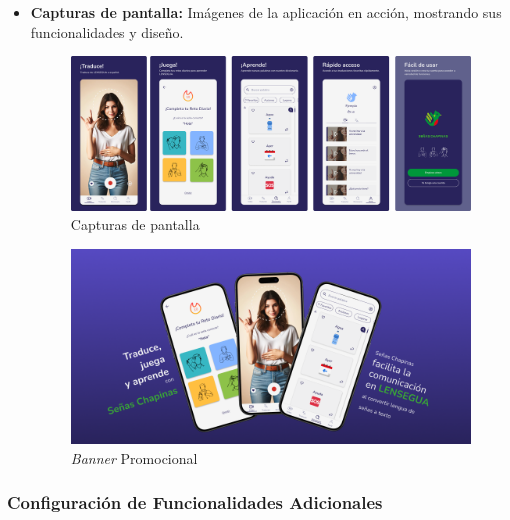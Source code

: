 \begin{itemize}
\begin{itemize}
        
        \item \textbf{Capturas de pantalla:} Imágenes de la aplicación en acción, mostrando sus funcionalidades y diseño.


        \begin{figure} [H]
            \centering
            \includegraphics[width=0.9\linewidth]{figuras/capturas_app.png}
            \caption{Capturas de pantalla}
            \label{fig:enter-label}
        \end{figure}

        \begin{figure} [H]
            \centering
            \includegraphics[width=0.9\linewidth]{figuras/promocional_app.png}
            \caption{\textit{Banner} Promocional}
            \label{fig:enter-label}
        \end{figure}
    \end{itemize}
\end{itemize}

\subsubsection{Configuración de Funcionalidades Adicionales}


